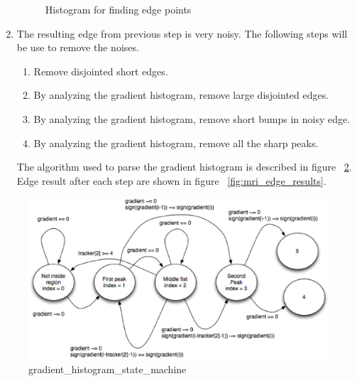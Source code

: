 \begin{enumerate}
\begin{figure}[htb]
      \caption{Histogram for finding edge points}
      \label{fig:mri_edge_point_histograms}
    \end{figure}
  \item The resulting edge from previous step is very noisy. The following steps will be use to remove the
    noises. 
    \begin{enumerate}
      \item Remove disjointed short edges.
      \item By analyzing the gradient histogram, remove large disjointed edges.
      \item By analyzing the gradient histogram, remove short bumps in noisy edge.
      \item By analyzing the gradient histogram, remove all the sharp peaks. 
    \end{enumerate}
    The algorithm used to parse the gradient histogram is described in figure ~\ref{fig:histogram_state_machine}. Edge result after each step are shown in figure ~\ref{fig:mri_edge_results}.
\end{enumerate}

\begin{figure}[htb]
  \hfill
  \begin{minipage}[b]{5in}
    \centering
    \centerline{\mbox{\includegraphics[width=5in]{data_extraction/images/MRI/histogram_state_machine.eps}}}
  \end{minipage}
  \hfill
  \caption{gradient_histogram_state_machine}
  \label{fig:histogram_state_machine}
\end{figure}

